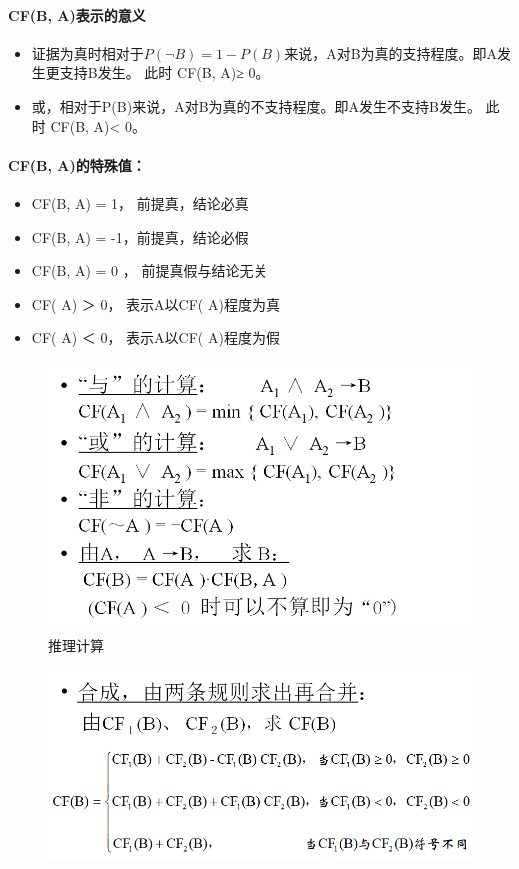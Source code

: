 \documentclass[UTF8,a4paper]{ctexart}
\begin{document}
\paragraph{CF(B, A)表示的意义}
\begin{itemize}
	\item 证据为真时相对于$P(\lnot B) = 1 - P(B)$来说，A对B为真的支持程度。即A发生更支持B发生。
	      此时 CF(B, A)≥ 0。
	\item 或，相对于P(B)来说，A对B为真的不支持程度。即A发生不支持B发生。
	      此时 CF(B, A)< 0。
\end{itemize}

\paragraph{CF(B, A)的特殊值：}
\begin{itemize}
	\item CF(B, A) = 1，	前提真，结论必真
	\item CF(B, A) = -1，前提真，结论必假
	\item CF(B, A) = 0 ， 前提真假与结论无关
	\item CF( A) ＞ 0， 表示A以CF( A)程度为真
	\item CF( A) ＜ 0， 表示A以CF( A)程度为假
\end{itemize}

\begin{figure}[H]
	\centering
	\includegraphics[scale = 0.5]{assets/ArtificialIntelligence/2018-01-09-00-27-15.png}
	\caption{推理计算}
\end{figure}

\begin{figure}[H]
	\centering
	\includegraphics[scale = 0.5]{assets/ArtificialIntelligence/2018-01-09-00-27-49.png}
\end{figure}
\end{document}
